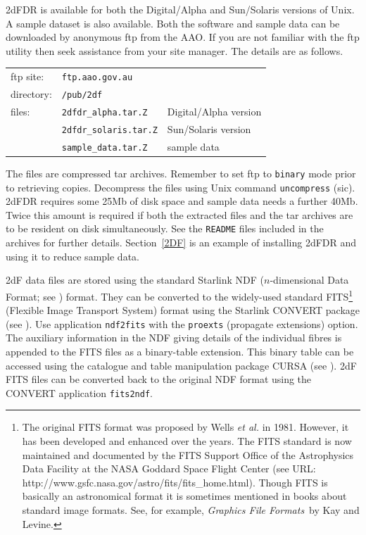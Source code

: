 \documentclass[twoside,11pt]{starlink}
\begin{document}
2dFDR is available for both the Digital/Alpha and Sun/Solaris versions
of Unix.  A sample dataset is also available.  Both the software and
sample data can be downloaded by anonymous ftp from the AAO.  If you are
not familiar with the ftp utility then seek assistance from your site
manager.  The details are as follows.

\begin{tabular}{lll}
ftp site:  & \texttt{ftp.aao.gov.au}       & \\
directory: & \texttt{/pub/2df}             & \\
files:     & \texttt{2dfdr\_alpha.tar.Z}   & Digital/Alpha version \\
           & \texttt{2dfdr\_solaris.tar.Z} & Sun/Solaris version   \\
           & \texttt{sample\_data.tar.Z}   & sample data           \\
\end{tabular}

The files are compressed tar archives.  Remember to set ftp to \texttt{binary}
mode prior to retrieving copies.  Decompress the files using Unix command
\texttt{uncompress} (sic).  2dFDR requires some 25Mb of disk space and
sample data needs a further 40Mb.  Twice this amount is required if
both the extracted files and the tar archives are to be resident on
disk simultaneously.  See the \texttt{README} files included in the archives
for further details.  Section~\ref{2DF} is an example of installing 2dFDR
and using it to reduce sample data.

2dF data files are stored using the standard Starlink NDF ($n$-dimensional
Data Format; see \cite{SUN33}) format.  They
can be converted to the widely-used standard FITS\footnote{The
original FITS format was proposed by Wells \textit{et al.}\/\cite{WELLS81}
in 1981.  However, it has been developed and enhanced over the years.
The FITS standard is now maintained and documented by the FITS Support
Office of the Astrophysics Data Facility at the NASA Goddard Space
Flight Center (see URL: 
{http://www.gsfc.nasa.gov/astro/fits/fits\_home.html}).
Though FITS is basically an astronomical format it is sometimes
mentioned in books about standard image formats.  See, for example,
\textit{Graphics File Formats}\, by Kay and Levine\cite{KAY95}.}
(Flexible Image Transport System) format using the Starlink CONVERT
package (see \cite{SUN55}).  Use application \texttt{ndf2fits} with the \texttt{proexts} (propagate extensions) option.  The
auxiliary information in the NDF giving details of the individual
fibres is appended to the FITS files as a binary-table extension.  This
binary table can be accessed using the catalogue and table manipulation
package CURSA (see \cite{SUN190}).  2dF FITS files
can be converted back to the original NDF format using the CONVERT
application \texttt{fits2ndf}.
\end{document}
